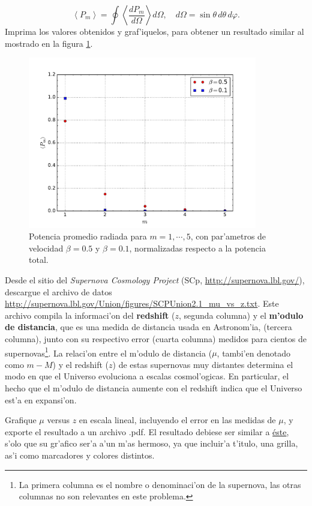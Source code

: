 \documentclass[11pt]{exam}
\begin{document}
\begin{questions}
\begin{parts}
\begin{equation}
\left\langle P_{m}\right\rangle  = \oint\left\langle \frac{dP_{m}}{d\Omega}\right\rangle d\Omega, \quad d\Omega = \sin\theta\,d\theta\,d\varphi.
\end{equation}
Imprima los valores obtenidos y graf'iquelos, para obtener un resultado similar al mostrado en la figura \ref{TER3}.
\begin{figure}[ht]
\centerline{\includegraphics[width=10cm]{fig-mas-potencia-total-comparacion.pdf}}
 \caption{Potencia promedio radiada para $m=1,\cdots,5$, con par'ametros de velocidad $\beta=0.5$ y  $\beta=0.1$, normalizadas respecto a la potencia total.}
\label{TER3}
\end{figure}
\end{parts}

\item Desde el sitio del \textit{Supernova Cosmology Project} (SCp,
\url{http://supernova.lbl.gov/}), descargue el archivo de datos  \url{http://supernova.lbl.gov/Union/figures/SCPUnion2.1_mu_vs_z.txt}.
Este archivo compila la informaci'on del \textbf{redshift} ($z$, segunda columna) y el \textbf{m'odulo de distancia}, que es una medida de distancia usada en Astronom'ia, (tercera columna), junto con su respectivo error (cuarta columna) medidos para cientos
de supernovas\footnote{La primera columna es el nombre o denominaci'on de
la supernova, las otras columnas no son relevantes en este problema.}.
La relaci'on entre el m'odulo de distancia ($\mu$, tambi'en denotado como $m-M$) y el redshift ($z$) de estas
supernovas muy distantes determina el modo en que el Universo evoluciona a escalas cosmol'ogicas. En particular, el hecho que el m'odulo de distancia aumente con el redshift indica que el Universo est'a en expansi'on. 

\begin{parts}
\item Grafique $\mu$ versus $z$ en escala lineal, incluyendo el error en las medidas de $\mu$, y exporte el resultado a un archivo .pdf. El resultado debiese ser similar a \href{https://github.com/gfrubi/RG/blob/master/fig/m-M-versus-z-con-error.pdf}{\'este}, s'olo que su gr'afico ser'a a'un m'as hermoso, ya que incluir'a t'itulo, una grilla, as'i como marcadores y colores distintos.


\end{parts}
\end{questions}
\end{document}
